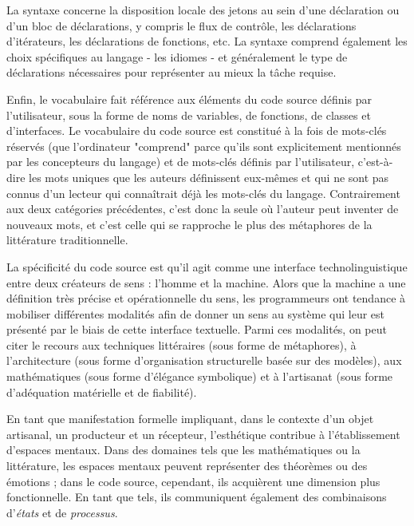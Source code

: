 \documentclass{article}
\begin{document}
La syntaxe concerne la disposition locale des jetons au sein d'une déclaration ou d'un bloc de déclarations, y compris le flux de contrôle, les déclarations d'itérateurs, les déclarations de fonctions, etc. La syntaxe comprend également les choix spécifiques au langage - les idiomes - et généralement le type de déclarations nécessaires pour représenter au mieux la tâche requise.

Enfin, le vocabulaire fait référence aux éléments du code source définis par l'utilisateur, sous la forme de noms de variables, de fonctions, de classes et d'interfaces. Le vocabulaire du code source est constitué à la fois de mots-clés réservés (que l'ordinateur "comprend" parce qu'ils sont explicitement mentionnés par les concepteurs du langage) et de mots-clés définis par l'utilisateur, c'est-à-dire les mots uniques que les auteurs définissent eux-mêmes et qui ne sont pas connus d'un lecteur qui connaîtrait déjà les mots-clés du langage. Contrairement aux deux catégories précédentes, c'est donc la seule où l'auteur peut inventer de nouveaux mots, et c'est celle qui se rapproche le plus des métaphores de la littérature traditionnelle.

La spécificité du code source est qu'il agit comme une interface technolinguistique entre deux créateurs de sens : l'homme et la machine. Alors que la machine a une définition très précise et opérationnelle du sens, les programmeurs ont tendance à mobiliser différentes modalités afin de donner un sens au système qui leur est présenté par le biais de cette interface textuelle.  Parmi ces modalités, on peut citer le recours aux techniques littéraires (sous forme de métaphores), à l'architecture (sous forme d'organisation structurelle basée sur des modèles), aux mathématiques (sous forme d'élégance symbolique) et à l'artisanat (sous forme d'adéquation matérielle et de fiabilité).

En tant que manifestation formelle impliquant, dans le contexte d'un objet artisanal, un producteur et un récepteur, l'esthétique contribue à l'établissement d'espaces mentaux. Dans des domaines tels que les mathématiques ou la littérature, les espaces mentaux peuvent représenter des théorèmes ou des émotions ; dans le code source, cependant, ils acquièrent une dimension plus fonctionnelle. En tant que tels, ils communiquent également des combinaisons d'\emph{états} et de \emph{processus}.
\end{document}
